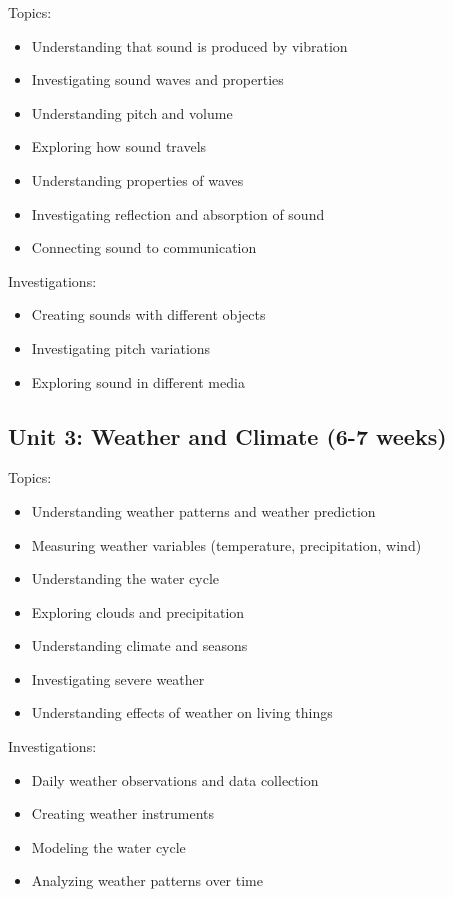 \documentclass[11pt,letterpaper]{report}
\begin{document}
Topics:
\begin{itemize}
\item Understanding that sound is produced by vibration
\item Investigating sound waves and properties
\item Understanding pitch and volume
\item Exploring how sound travels
\item Understanding properties of waves
\item Investigating reflection and absorption of sound
\item Connecting sound to communication
\end{itemize}

Investigations:
\begin{itemize}
\item Creating sounds with different objects
\item Investigating pitch variations
\item Exploring sound in different media
\end{itemize}

\subsection{Unit 3: Weather and Climate (6-7 weeks)}

Topics:
\begin{itemize}
\item Understanding weather patterns and weather prediction
\item Measuring weather variables (temperature, precipitation, wind)
\item Understanding the water cycle
\item Exploring clouds and precipitation
\item Understanding climate and seasons
\item Investigating severe weather
\item Understanding effects of weather on living things
\end{itemize}

Investigations:
\begin{itemize}
\item Daily weather observations and data collection
\item Creating weather instruments
\item Modeling the water cycle
\item Analyzing weather patterns over time
\end{itemize}
\end{document}
